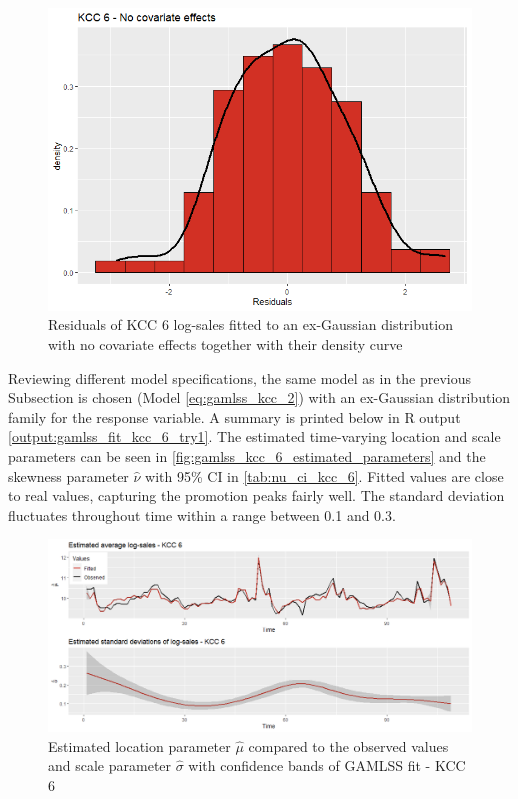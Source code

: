 \begin{figure}[H]
\centering
  \includegraphics[width=0.45\linewidth]{figures/res_kcc_6_no_covariates.png}
  \caption{Residuals of KCC 6 log-sales fitted to an ex-Gaussian distribution with no covariate effects together with their density curve}
  \label{fig:res_kcc_6_no_covariates}
\end{figure}


Reviewing different model specifications, the same model as in the previous Subsection is chosen (Model \ref{eq:gamlss_kcc_2}) with an ex-Gaussian distribution family for the response variable. A summary is printed below in R output \ref{output:gamlss_fit_kcc_6_try1}.
The estimated time-varying location and scale parameters can be seen in \autoref{fig:gamlss_kcc_6_estimated_parameters} and the skewness parameter $\hat{\nu}$ with 95\% CI in \autoref{tab:nu_ci_kcc_6}. Fitted values are close to real values, capturing the promotion peaks fairly well. The standard deviation fluctuates throughout time within a range between 0.1 and 0.3.
\\






\begin{figure}[H]
\centering
  \includegraphics[width=0.95\linewidth]{figures/gamlss_kcc_6_estimated_parameters.png}
  \caption{Estimated location parameter $\hat{\mu}$ compared to the observed values and scale parameter $\hat{\sigma}$ with confidence bands of GAMLSS fit - KCC 6}
  \label{fig:gamlss_kcc_6_estimated_parameters}
\end{figure}



